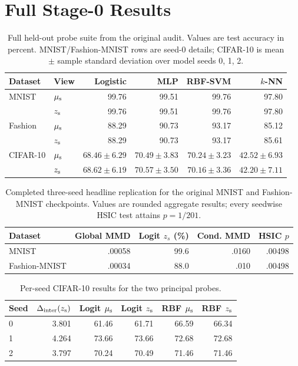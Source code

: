 \section{Full Stage-0 Results}
\label{app:full-results}

\begin{table}[ht]
\caption{Full held-out probe suite from the original audit.  Values are test
accuracy in percent.  MNIST/Fashion-MNIST rows are seed-0 details; CIFAR-10 is
mean $\pm$ sample standard deviation over model seeds 0, 1, 2.}
\label{tab:full-probes}
\centering
\small
\begin{tabular}{llrrrr}
\toprule
Dataset & View & Logistic & MLP & RBF-SVM & $k$-NN \\
\midrule
MNIST & $\mu_{\mathrm{s}}$ & 99.76 & 99.51 & 99.76 & 97.80 \\
      & $z_{\mathrm{s}}$  & 99.76 & 99.51 & 99.76 & 97.80 \\
Fashion & $\mu_{\mathrm{s}}$ & 88.29 & 90.73 & 93.17 & 85.12 \\
        & $z_{\mathrm{s}}$  & 88.29 & 90.73 & 93.17 & 85.61 \\
CIFAR-10 & $\mu_{\mathrm{s}}$ & $68.46\pm6.29$ & $70.49\pm3.83$ &
$70.24\pm3.23$ & $42.52\pm6.93$ \\
         & $z_{\mathrm{s}}$ & $68.62\pm6.19$ & $70.57\pm3.50$ &
$70.16\pm3.36$ & $42.20\pm7.11$ \\
\bottomrule
\end{tabular}
\end{table}

\begin{table}[ht]
\caption{Completed three-seed headline replication for the original MNIST and
Fashion-MNIST checkpoints.  Values are rounded aggregate results; every
seedwise HSIC test attains $p=1/201$.}
\label{tab:mnist-fashion-aggregate-v9}
\centering
\small
\begin{tabular}{lrrrr}
\toprule
Dataset & Global MMD & Logit $z_s$ (\%) & Cond. MMD & HSIC $p$ \\
\midrule
MNIST & .00058 & 99.6 & .0160 & .00498 \\
Fashion-MNIST & .00034 & 88.0 & .010 & .00498 \\
\bottomrule
\end{tabular}
\end{table}

\begin{table}[ht]
\caption{Per-seed CIFAR-10 results for the two principal probes.}
\label{tab:cifar-seeds}
\centering
\small
\begin{tabular}{lrrrrr}
\toprule
Seed & $\Delta_{\mathrm{inter}}(z_{\mathrm{s}})$ & Logit $\mu_{\mathrm{s}}$ & Logit $z_{\mathrm{s}}$ & RBF $\mu_{\mathrm{s}}$ & RBF $z_{\mathrm{s}}$ \\
\midrule
0 & 3.801 & 61.46 & 61.71 & 66.59 & 66.34 \\
1 & 4.264 & 73.66 & 73.66 & 72.68 & 72.68 \\
2 & 3.797 & 70.24 & 70.49 & 71.46 & 71.46 \\
\bottomrule
\end{tabular}
\end{table}

